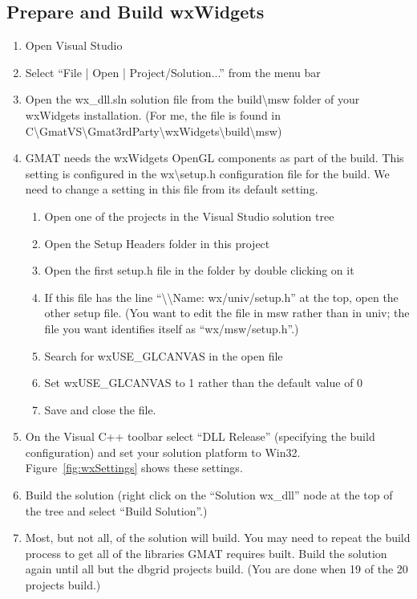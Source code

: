 \documentclass[letterpaper,10pt]{article}%
\begin{document}
{\begin{enumerate}
\end{enumerate}

\subsection{Prepare and Build wxWidgets}
\begin{enumerate}
\item Open Visual Studio
\item Select ``File | Open | Project/Solution...'' from the menu bar
\item Open the wx\_dll.sln solution file from the build\textbackslash msw folder of your wxWidgets installation.  (For me, the file is found in  C\:\textbackslash GmatVS\textbackslash Gmat3rdParty\textbackslash wxWidgets\textbackslash build\textbackslash msw)
\item GMAT needs the wxWidgets OpenGL components as part of the build.  This setting is configured in the wx\textbackslash setup.h configuration file for the build.  We need to change a setting in this file from its default setting.
\begin{enumerate}
	\item Open one of the projects in the Visual Studio solution tree
	\item Open the Setup Headers folder in this project
	\item Open the first setup.h file in the folder by double clicking on it
	\item If this file has the line ``\textbackslash\textbackslash  Name:        wx/univ/setup.h'' at the top, open the other setup file. (You want to edit the file in msw rather than in univ; the file you want identifies itself as ``wx/msw/setup.h''.)
	\item Search for wxUSE\_GLCANVAS in the open file
	\item Set wxUSE\_GLCANVAS to 1 rather than the default value of 0
	\item Save and close the file.
\end{enumerate}
\item On the Visual C++ toolbar select ``DLL Release'' (specifying the build configuration) and set your solution platform to Win32.  Figure~\ref{fig:wxSettings} shows these settings.
\item Build the solution (right click on the ``Solution wx\_dll{}'' node at the top of the tree and select ``Build Solution''.)
\item Most, but not all, of the solution will build.  You may need to repeat the build process to get all of the libraries GMAT requires built.  Build the solution again until all but the dbgrid projects build.  (You are done when 19 of the 20 projects build.)

\end{enumerate}}
\end{document}
